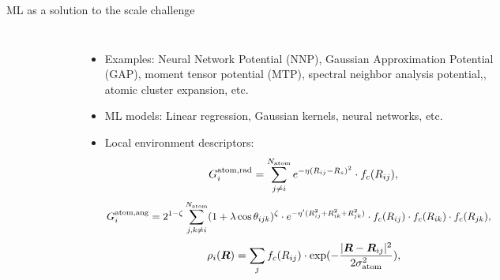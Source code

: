 \documentclass[aspectratio=169]{beamer}
\begin{document}
    \begin{frame}{ML as a solution to the scale challenge}
        \begin{columns}
            \begin{figure}
                \centering
                \includegraphics[width=\textwidth]{figures/ML-IAP.jpg}
            \end{figure}
            \begin{itemize}
                \small
                \item Examples: Neural Network Potential (NNP)\cite{behlerHighDimensionalNeuralNetwork}, Gaussian Approximation Potential (GAP)\cite{bartokGaussianApproximationPotentials2010}, moment tensor potential (MTP)\cite{novikovMLIPPackageMoment2021}, spectral neighbor analysis potential,\cite{thompsonSpectralNeighborAnalysis2015}, atomic cluster expansion\cite{drautzAtomicClusterExpansion2020}, etc.
                \item ML models: Linear regression, Gaussian kernels, neural networks, etc.
                \item Local environment descriptors:
                \tiny{
                    \begin{equation*}
                        G_{i}^{\rm atom, \rm rad} = \sum_{j\neq i}^{N_{\rm atom}} e^{-\eta(R_{ij}-R_{s})^{2}} \cdot f_{c}(R_{ij}),
                    \end{equation*}
                    \begin{equation*}
                        \begin{split}
                            G_{i}^{\rm atom, \rm ang}&=2^{1-\zeta}\sum_{j,k \neq i}^{N_{\rm atom}} (1 + \lambda \cos \theta_{ijk})^{\zeta} \cdot e^{-\eta^{\prime}(R_{ij}^{2}+R_{ik}^{2}+R_{jk}^{2})}
                            \cdot f_{c}(R_{ij}) \cdot f_{c}(R_{ik}) \cdot f_{c}(R_{jk}),
                        \end{split}
                    \end{equation*}}
                \begin{equation*}
                    \rho_{i}(\boldsymbol{R}) = \sum_{j} f_{c}(R_{ij}) \cdot \exp(-\frac{|\boldsymbol{R} - \boldsymbol{R}_{ij}|^{2}}{2\sigma_{\rm atom}^{2}}),
                \end{equation*}


\end{itemize}
\end{columns}
\end{frame}
\end{document}

